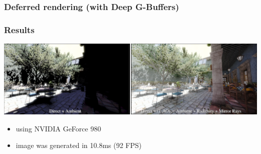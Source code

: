 \documentclass{beamer}
\begin{document}
	\begin{frame}
		\frametitle{Deferred rendering (with Deep G-Buffers)}
	\end{frame}	

	\begin{frame}
		\frametitle{Results}
		\includegraphics[width=\textwidth]{img/deep_g_buffer_render.png}
		\begin{itemize}
			\item using NVIDIA GeForce 980
			\item image was generated in 10.8ms (92 FPS)
		\end{itemize}
	\end{frame}
\end{document}
